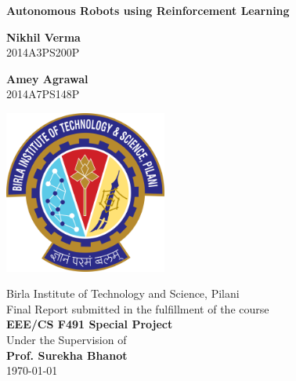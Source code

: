\documentclass[12pt]{extreport}
\begin{document}
\begin{titlepage}
 \begin{center}

  \vspace*{1cm}

  \begin{huge}
   \textbf{Autonomous Robots using Reinforcement Learning}
  \end{huge}

  \vspace{0.5cm}

  \begin{multicols}{2}
   \textbf{Nikhil Verma}\\
   2014A3PS200P

   \textbf{Amey Agrawal}\\
   2014A7PS148P
  \end{multicols}

  \vspace{1cm}

  \includegraphics[width=0.4\textwidth]{logo}
  \vspace{1cm}

  Birla Institute of Technology and Science, Pilani\\
  \vspace{0.5cm}
  Final Report submitted in the fulfillment of the course\\
  \textbf{EEE/CS F491 Special Project}\\
  Under the Supervision of\\
  \textbf{Prof. Surekha Bhanot}\\
  \vspace{0.5cm}
  \today


 \end{center}
\end{titlepage}

\tableofcontents
\end{document}
